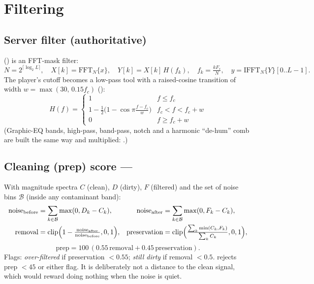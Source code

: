 \documentclass[11pt,a4paper]{article}
\begin{document}
\section{Filtering}
\subsection{Server filter (authoritative)}
 () is an FFT-mask filter:
\[
N=2^{\lceil\log_2 L\rceil},\quad X[k]=\mathrm{FFT}_N\{x\},\quad
Y[k]=X[k]\,H(f_k),\quad f_k=\tfrac{kF_s}{N},\quad y=\mathrm{IFFT}_N\{Y\}[0..L-1].
\]
The player's cutoff becomes a low-pass tool with a raised-cosine transition of width
$w=\max(30,\,0.15f_c)$ ():
\[
H(f)=\begin{cases}1 & f\le f_c\\[2pt]
1-\tfrac12\bigl(1-\cos\pi\tfrac{f-f_c}{w}\bigr) & f_c<f<f_c+w\\[2pt]
0 & f\ge f_c+w\end{cases}
\]
(Graphic-EQ bands, high-pass, band-pass, notch and a harmonic ``de-hum'' comb are built the
same way and multiplied: .)

\subsection{Cleaning (prep) score --- }
With magnitude spectra $C$ (clean), $D$ (dirty), $F$ (filtered) and the set of noise bins
$\mathcal{B}$ (inside any contaminant band):
\begin{align*}
\text{noise}_{\text{before}}&=\sum_{k\in\mathcal B}\max(0,D_k-C_k), &
\text{noise}_{\text{after}}&=\sum_{k\in\mathcal B}\max(0,F_k-C_k),\\
\text{removal}&=\operatorname{clip}\Bigl(1-\tfrac{\text{noise}_{\text{after}}}{\text{noise}_{\text{before}}},0,1\Bigr), &
\text{preservation}&=\operatorname{clip}\Bigl(\tfrac{\sum_k\min(C_k,F_k)}{\sum_k C_k},0,1\Bigr),
\end{align*}
\[
\text{prep}=100\,(0.55\,\text{removal}+0.45\,\text{preservation}).
\]
Flags: \emph{over-filtered} if preservation $<0.55$; \emph{still dirty} if removal $<0.5$.
 rejects prep $<45$ or either flag. It is deliberately not a
distance to the clean signal, which would reward doing nothing when the noise is quiet.
\end{document}
